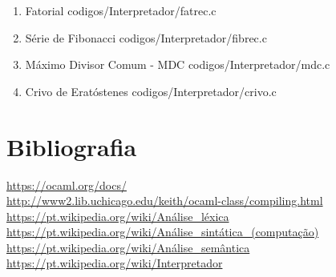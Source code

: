 \documentclass[12pt,a4paper,twoside]{report}
\begin{document}
\begin{enumerate}
\item{Fatorial}
 {codigos/Interpretador/fatrec.c}
\item{Série de Fibonacci}
 {codigos/Interpretador/fibrec.c}
\item{Máximo Divisor Comum - MDC}
 {codigos/Interpretador/mdc.c}
\item{Crivo de Eratóstenes}
 {codigos/Interpretador/crivo.c}
\end{enumerate}

\chapter{Bibliografia}
\url{https://ocaml.org/docs/}\\

\url{http://www2.lib.uchicago.edu/keith/ocaml-class/compiling.html}\\

\url{https://pt.wikipedia.org/wiki/Análise_léxica}\\

\url{https://pt.wikipedia.org/wiki/Análise_sintática_(computação)}\\

\url{https://pt.wikipedia.org/wiki/Análise_semântica}\\

\url{https://pt.wikipedia.org/wiki/Interpretador}
\end{document}
